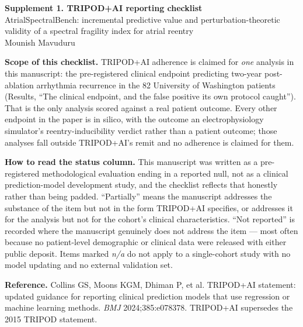 \documentclass[10pt]{article}
\begin{document}
\begin{center}
{\Large\bfseries Supplement 1. TRIPOD+AI reporting checklist}\\[4pt]
{\large AtrialSpectralBench: incremental predictive value and
perturbation-theoretic validity of a spectral fragility index for atrial reentry}\\[2pt]
Mounish Mavuduru
\end{center}

\vspace{0.6em}

\textbf{Scope of this checklist.} TRIPOD+AI adherence is claimed for
\emph{one} analysis in this manuscript: the pre-registered clinical endpoint
predicting two-year post-ablation arrhythmia recurrence in the 82 University of
Washington patients (Results, ``The clinical endpoint, and the false positive its
own protocol caught''). That is the only analysis scored against a real patient
outcome. Every other endpoint in the paper is in silico, with the outcome an
electrophysiology simulator's reentry-inducibility verdict rather than a patient
outcome; those analyses fall outside TRIPOD+AI's remit and no adherence is
claimed for them.

\textbf{How to read the status column.} This manuscript was written as a
pre-registered methodological evaluation ending in a reported null, not as a
clinical prediction-model development study, and the checklist reflects that
honestly rather than being padded. ``Partially'' means the manuscript addresses
the substance of the item but not in the form TRIPOD+AI specifies, or addresses
it for the analysis but not for the cohort's clinical characteristics.
``Not reported'' is recorded where the manuscript genuinely does not address the
item --- most often because no patient-level demographic or clinical data were
released with either public deposit. Items marked \emph{n/a} do not apply to a
single-cohort study with no model updating and no external validation set.

\textbf{Reference.} Collins GS, Moons KGM, Dhiman P, et al. TRIPOD+AI statement:
updated guidance for reporting clinical prediction models that use regression or
machine learning methods. \emph{BMJ} 2024;385:e078378. TRIPOD+AI supersedes the
2015 TRIPOD statement.

\vspace{0.8em}
\end{document}
